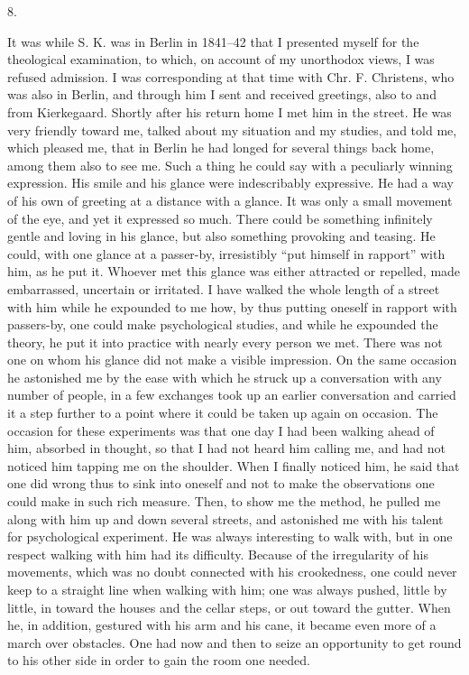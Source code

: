 \documentclass[12pt,a4paper,openany]{book}
\newcommand{\secnum}[1]{\par\begin{center}#1\end{center}\par\nobreak}
\newcommand{\opage}[1]{\marginnote{\footnotesize\textit{[#1]}}}
\begin{document}
\secnum{8.}

It was while S. K. was in Berlin in 1841--42 that I
presented myself for the theological examination, to which, on account
of my unorthodox views, I was refused admission.
I was corresponding at that time with Chr. F. Christens, who
was also in Berlin, and through him I sent and received
greetings, also to and from Kierkegaard. Shortly after
his return home I met him in the street. He was
\opage{343}very friendly toward me, talked about my situation and my
studies, and told me, which pleased me, that in
Berlin he had longed for several things back home, among them
also to see me. Such a thing he could say with
a peculiarly winning expression. His smile and his
glance were indescribably expressive. He had a way of his own
of greeting at a distance with a glance. It was only
a small movement of the eye, and yet it expressed so much.
There could be something infinitely gentle and loving in his
glance, but also something provoking and teasing. He could,
with one glance at a passer-by, irresistibly ``put
himself in rapport'' with him, as he put it. Whoever
met this glance was either attracted or repelled,
made embarrassed, uncertain or irritated. I have walked the whole
length of a street with him while he expounded to me
how, by thus putting oneself in rapport with
passers-by, one could make psychological studies, and
while he expounded the theory, he put it into
practice with nearly every person we met. There
was not one on whom his glance did not make a visible
impression. On the same occasion he astonished me by
the ease with which he struck up a conversation with
any number of people, in a few exchanges took up an
earlier conversation and carried it a step further to a
point where it could be taken up again on occasion.
The occasion for these experiments was that one day I
had been walking ahead of him, absorbed in thought, so that I
had not heard him calling me, and had not noticed
him tapping me on the shoulder. When I finally noticed
him, he said that one did wrong thus to sink
into oneself and not to make the observations one could
make in such rich measure. Then, to show me the method,
he pulled me along with him up and down several streets, and astonished
me with his talent for psychological experiment.
He was always interesting to walk with, but in one respect
walking with him had its difficulty.
\opage{344}Because of the irregularity of his movements, which
was no doubt connected with his crookedness, one could
never keep to a straight line when walking with him;
one was always pushed, little by little, in toward the houses
and the cellar steps, or out toward the gutter. When
he, in addition, gestured with his arm and his cane,
it became even more of a march over obstacles.
One had now and then to seize an opportunity to
get round to his other side in order to gain
the room one needed.
\end{document}
